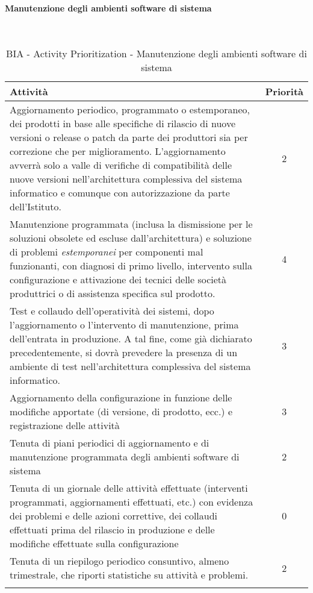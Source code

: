 \paragraph{Manutenzione degli ambienti software di sistema}
\textcolor{white}{.} \\
\renewcommand\arraystretch{1,5}
\begin{longtable}{p{11cm} c }
\toprule
\textbf{Attività} & \textbf{Priorità} \\
\toprule
Aggiornamento   periodico,   programmato   o   estemporaneo,   dei   prodotti   in   base   alle specifiche  di  rilascio  di  nuove  versioni  o  release  o  patch  da  parte  dei  produttori  sia  per correzione  che  per  miglioramento.  L’aggiornamento  avverrà  solo  a  valle  di  verifiche  di compatibilità  delle  nuove  versioni  nell’architettura  complessiva  del  sistema  informatico  e comunque con autorizzazione da parte dell’Istituto.  
 & 2 \\
Manutenzione  programmata  (inclusa  la  dismissione  per  le  soluzioni  obsolete  ed  escluse dall’architettura)  e  soluzione  di  problemi  \textit{estemporanei}  per  componenti  mal  funzionanti, con diagnosi di primo livello, intervento sulla configurazione e attivazione dei tecnici delle società produttrici o di assistenza specifica sul prodotto.    &4 \\
Test  e  collaudo  dell’operatività  dei  sistemi,  dopo  l’aggiornamento  o  l’intervento  di 
manutenzione,   prima   dell’entrata   in   produzione.   A   tal   fine,   come   già   dichiarato 
precedentemente, si dovrà prevedere la presenza di un ambiente  di test nell’architettura 
complessiva del sistema informatico.   &3 \\
Aggiornamento della configurazione in funzione delle modifiche apportate (di versione, di prodotto, ecc.) e registrazione delle attività    & 3 \\
Tenuta di piani periodici di aggiornamento e di manutenzione programmata degli ambienti software di sistema   &2 \\
Tenuta di un  giornale  delle  attività  effettuate  (interventi  programmati,  aggiornamenti  effettuati,  etc.) con evidenza  dei problemi e delle azioni correttive, dei collaudi effettuati prima del rilascio in produzione e delle modifiche effettuate sulla configurazione  & 0 \\
Tenuta di un  riepilogo  periodico  consuntivo,  almeno  trimestrale,  che  riporti  statistiche  su  attività  e problemi. & 2 \\
\bottomrule
\caption{BIA - Activity Prioritization - Manutenzione degli ambienti software di sistema}
\end{longtable}

